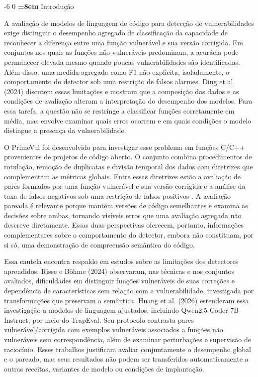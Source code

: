 \documentclass[12pt,a4paper]{article}
\makeatletter
\newcommand{\XIIIPT}{\@setfontsize\xiiipt{13}{17}}
\renewcommand\section{\@startsection{section}{1}{\z@}%
                       {-6\p@ \@plus -4\p@ \@minus -4\p@}%
                       {0\p@ \@plus 4\p@ \@minus 4\p@}%
                       {\normalfont\XIIIPT\bfseries\boldmath
                        \rightskip=\z@ \@plus 8em\pretolerance=10000 }}
\makeatother
\begin{document}
\section{Introdução}
\label{sec:introducao}

A avaliação de modelos de linguagem de código para detecção de vulnerabilidades exige distinguir o desempenho agregado de classificação da capacidade de reconhecer a diferença entre uma função vulnerável e sua versão corrigida. Em conjuntos nos quais as funções não vulneráveis predominam, a acurácia pode permanecer elevada mesmo quando poucas vulnerabilidades são identificadas. Além disso, uma medida agregada como F1 não explicita, isoladamente, o comportamento do detector sob uma restrição de falsos alarmes. Ding et al. (2024) discutem essas limitações e mostram que a composição dos dados e as condições de avaliação alteram a interpretação do desempenho dos modelos. Para essa tarefa, a questão não se restringe a classificar funções corretamente em média, mas envolve examinar quais erros ocorrem e em quais condições o modelo distingue a presença da vulnerabilidade.

O PrimeVul foi desenvolvido para investigar esse problema em funções C/C++ provenientes de projetos de código aberto. O conjunto combina procedimentos de rotulação, remoção de duplicatas e divisão temporal dos dados com diretrizes que complementam as métricas globais. Entre essas diretrizes estão a avaliação de pares formados por uma função vulnerável e sua versão corrigida e a análise da taxa de falsos negativos sob uma restrição de falsos positivos \cite{ding2024primevul}. A avaliação pareada é relevante porque mantém versões de código semelhantes e examina as decisões sobre ambas, tornando visíveis erros que uma avaliação agregada não descreve diretamente. Essas duas perspectivas oferecem, portanto, informações complementares sobre o comportamento do detector, embora não constituam, por si só, uma demonstração de compreensão semântica do código.

Essa cautela encontra respaldo em estudos sobre as limitações dos detectores aprendidos. Risse e Böhme (2024) observaram, nas técnicas e nos conjuntos avaliados, dificuldades em distinguir funções vulneráveis de suas correções e dependência de características sem relação com a vulnerabilidade, investigada por transformações que preservam a semântica. Huang et al. (2026) estenderam essa investigação a modelos de linguagem ajustados, incluindo Qwen2.5-Coder-7B-Instruct, por meio do TrapEval. Seu protocolo contrasta pares vulnerável/corrigida com exemplos vulneráveis associados a funções não vulneráveis sem correspondência, além de examinar perturbações e supervisão de raciocínio. Esses trabalhos justificam avaliar conjuntamente o desempenho global e o pareado, mas seus resultados não podem ser transferidos automaticamente a outras receitas, variantes de modelo ou condições de implantação.
\end{document}

